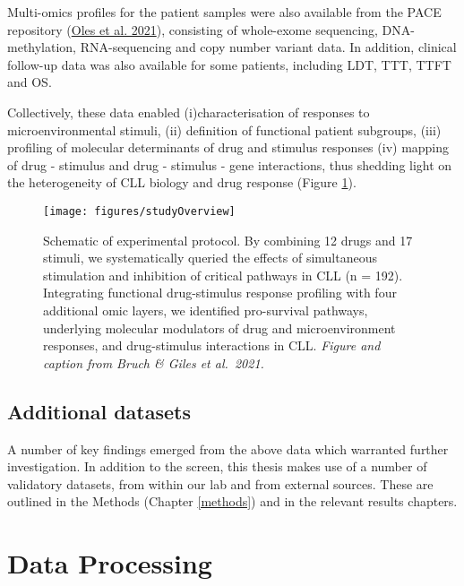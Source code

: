 \documentclass[11pt, a4paper, twosided]{book}
\begin{document}
Multi-omics profiles for the patient samples were also available from the PACE repository (\protect\hyperlink{ref-R-BloodCancerMultiOmics2017}{Oles et al. 2021}), consisting of whole-exome sequencing, DNA-methylation, RNA-sequencing and copy number variant data. In addition, clinical follow-up data was also available for some patients, including LDT, TTT, TTFT and OS.

Collectively, these data enabled (i)characterisation of responses to microenvironmental stimuli, (ii) definition of functional patient subgroups, (iii) profiling of molecular determinants of drug and stimulus responses (iv) mapping of drug - stimulus and drug - stimulus - gene interactions, thus shedding light on the heterogeneity of CLL biology and drug response (Figure \ref{fig:studyOverview}).


\begin{figure}

{\centering \texttt{[image: figures/studyOverview]} 

}

\caption{Schematic of experimental protocol. By combining 12 drugs and 17 stimuli, we systematically queried the effects of simultaneous stimulation and inhibition of critical pathways in CLL (n = 192). Integrating functional drug-stimulus response profiling with four additional omic layers, we identified pro-survival pathways, underlying molecular modulators of drug and microenvironment responses, and drug-stimulus interactions in CLL. \emph{Figure and caption from Bruch \& Giles et al.~2021.}}\label{fig:studyOverview}
\end{figure}
\hypertarget{additional-datasets}{%
\subsection{Additional datasets}\label{additional-datasets}}

A number of key findings emerged from the above data which warranted further investigation. In addition to the screen, this thesis makes use of a number of validatory datasets, from within our lab and from external sources. These are outlined in the Methods (Chapter \ref{methods}) and in the relevant results chapters.

\hypertarget{data-processing-1}{%
\section{Data Processing}\label{data-processing-1}}
\end{document}
